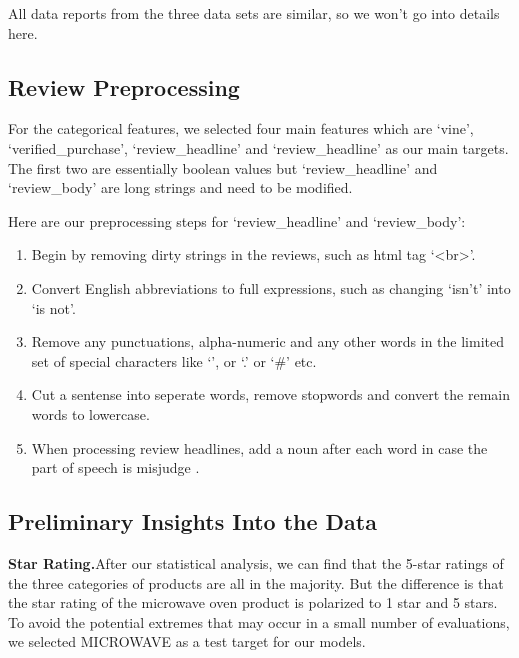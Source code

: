 \documentclass[12pt]{article}  %
\begin{document}
All data reports from the three data sets are similar, so we won't go into details here.

\subsection{Review Preprocessing}
For the categorical features, we selected four main features which are `vine', `verified\_purchase', `review\_headline' and `review\_headline' as our main targets. The first two are essentially boolean values but `review\_headline' and `review\_body' are long strings and need to be modified.

Here are our preprocessing steps for `review\_headline' and `review\_body':


\begin{enumerate}[\bfseries 1.]

	\item Begin by removing dirty strings in the reviews, such as html tag `<br>'.
	
	\item Convert English abbreviations to full expressions, such as changing `isn't' into `is not'.
	
	\item Remove any punctuations, alpha-numeric and any other words in the limited set of special characters like `', or `.' or `\#' etc.
	
	\item Cut a sentense into seperate words, remove stopwords and convert the remain words to lowercase.
	
	\item When processing review headlines, add a noun after each word in case the part of speech is misjudge .

\end{enumerate}

\subsection{Preliminary Insights Into the Data}

\textbf{Star Rating.}After our statistical analysis, we can find that the 5-star ratings of the three categories of products are all in the majority. But the difference is that the star rating of the microwave oven product is polarized to 1 star and 5 stars. To avoid the potential extremes that may occur in a small number of evaluations, we selected MICROWAVE as a test target for our models.
\end{document}
